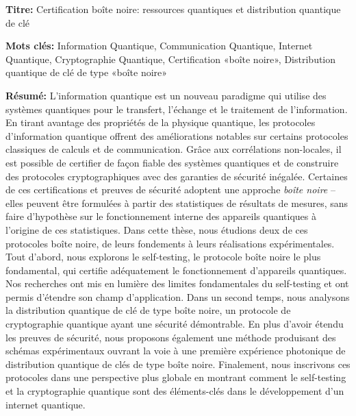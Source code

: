 \documentclass[french,12pt,a4paper]{book}
\begin{document}
\begin{mdframed}[linecolor=Prune,linewidth=1]
	
	\textbf{Titre:} Certification \guillemotleft bo\^ite noire\guillemotright: ressources quantiques et distribution quantique de clé 

	\noindent \textbf{Mots clés:} Information Quantique, Communication Quantique, Internet Quantique, Cryptographie Quantique, Certification «boîte noire», Distribution quantique de clé de type «boîte noire»

	\vspace{-.5cm}
	\begin{multicols}{2}
		\noindent \textbf{Résumé:}
		L'information quantique est un nouveau paradigme qui utilise des systèmes quantiques pour le transfert, l'échange et le traitement de l'information.
		En tirant avantage des propriétés de la physique quantique, les protocoles d'information quantique offrent des améliorations notables sur certains protocoles classiques de calculs et de communication.
		Grâce aux corrélations non-locales, il est possible de certifier de façon fiable des systèmes quantiques et de construire des protocoles cryptographiques avec des garanties de sécurité inégalée.
		Certaines de ces certifications et preuves de sécurité adoptent une approche \textit{boîte noire} -- elles peuvent être formulées à partir des statistiques de résultats de mesures, sans faire d'hypothèse sur le fonctionnement interne des appareils quantiques à l'origine de ces statistiques.
		Dans cette thèse, nous étudions deux de ces protocoles boîte noire, de leurs fondements à leurs réalisations expérimentales.
		Tout d'abord, nous explorons le self-testing, le protocole boîte noire le plus fondamental, qui certifie adéquatement le fonctionnement d'appareils quantiques.
		Nos recherches ont mis en lumière des limites fondamentales du self-testing et ont permis d'étendre son champ d'application. 
		Dans un second temps, nous analysons la distribution quantique de clé de type boîte noire, un protocole de cryptographie quantique ayant une sécurité démontrable.
		En plus d'avoir étendu les preuves de sécurité, nous proposons également une méthode produisant des schémas expérimentaux ouvrant la voie à une première expérience photonique de distribution quantique de clés de type boîte noire.    
		Finalement, nous inscrivons ces protocoles dans une perspective plus globale en montrant comment le self-testing et la cryptographie quantique sont des éléments-clés dans le développement d'un internet quantique.
	\end{multicols}
\end{mdframed}
\end{document}
